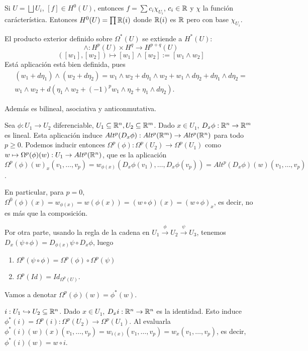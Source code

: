 \documentclass[CV.tex]{subfiles}
\begin{document}
Si $U=\bigsqcup U_i$, $[f]\in H^0(U)$, entonces $f=\sum c_i\chi_{U_i}$, $c_i\in\mathbb{R}$ y $\chi$ la función carácterística. Entonces $H^0(U)=\prod \mathbb{R}(i)$ donde $\mathbb{R}(i)$ es $\mathbb{R}$ pero con base $\chi_{U_i}$. 

El producto exterior definido sobre $\Omega^*(U)$ se extiende a $H^*(U)$:
\[
\land: H^p(U)\times H^q\to H^{p+q}(U)
\]
\[
([w_1],[w_2])\longmapsto [w_1]\land [w_2]:=[w_1\land w_2]
\]
Está aplicación está bien definida, pues
\begin{gather*}
(w_1+d\eta_1)\land(w_2+d\eta_2)=w_1\land w_2+d\eta_1\land w_2+ w_1\land d\eta_2+d\eta_1\land d\eta_2=\\
w_1\land w_2+d(\eta_1\land w_2+(-1)^pw_1\land \eta_2+\eta_1\land d\eta_2).
\end{gather*}

Además es bilineal, asociativa y anticonmutativa.  

Sea $\phi:U_1\to U_2$ diferenciable, $U_1\subseteq\mathbb{R}^n, U_2\subseteq\mathbb{R}^m$. Dado $x\in U_1$, $D_x\phi:\mathbb{R}^n\to \mathbb{R}^m$ es lineal. Esta aplicación induce $Alt^p(D_x\phi): Alt^p(\mathbb{R}^m)\to Alt^p(\mathbb{R}^n)$ para todo $p\geq 0$. Podemos inducir entonces $\Omega^p(\phi):\Omega^p(U_2)\to\Omega^p(U_1)$ como $w\mapsto\Omega^p(\phi)(w):U_1\to Alt^p(\mathbb{R}^n)$, que es la aplicación $\Omega^p(\phi)(w)_x(v_1,\dots, v_p)=w_{\phi(x)}(D_x\phi(v_1),\dots, D_x\phi(v_p))=Alt^p(D_x\phi)(w)(v_1,\dots, v_p)$.

En particular, para $p=0$, $\Omega^0(\phi)(x)=w_{\phi(x)}=w(\phi(x))=(w\circ\phi)(x)=(w\circ\phi)_x$, es decir, no es más que la composición. 

Por otra parte, usando la regla de la cadena en $U_1\overset{\phi}{\to}U_2\overset{\psi}{\to}U_3$, tenemos $D_x(\psi\circ\phi)=D_{\phi(x)}\psi\circ D_x\phi$, luego
\begin{enumerate}
\item $\Omega^p(\psi\circ\phi)=\Omega^p(\phi)\circ\Omega^p(\psi)$
\item $\Omega^p(Id)=Id_{\Omega^p(U)}$.
\end{enumerate}
Vamos a denotar $\Omega^p(\phi)(w)=\phi^*(w)$.
\begin{nota}
$i:U_1\hookrightarrow U_2\subseteq\mathbb{R}^n$. Dado $x\in U_1$, $D_x i:\mathbb{R}^n\to\mathbb{R}^n$ es la identidad. Esto induce $\phi^*(i)=\Omega^p(i):\Omega^p(U_2)\to \Omega^p(U_1)$. Al evaluarla $\phi^*(i)(w)(x)(v_1,\dots, v_p)=w_{i(x)}(v_1,\dots, v_p)=w_x(v_1,\dots, v_p)$, es decir, $\phi^*(i)(w)=w\circ i$.
\end{nota}
\end{document}
